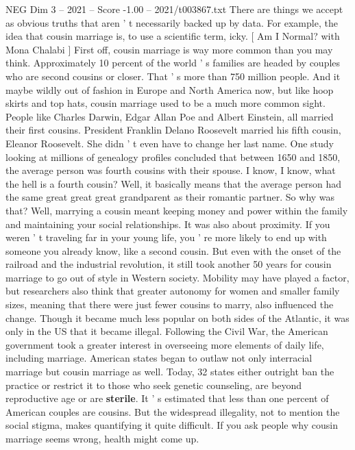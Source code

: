 \begin{textsample}{NEG Dim 3 – 2021 – Score -1.00 – 2021/t003867.txt}  \label{ex:f3_neg_052}
There are things we accept as obvious truths that aren ' t necessarily backed up by data.
For example, the idea that cousin marriage is, to use a scientific term, icky. [ Am I Normal? with Mona Chalabi ] First off, cousin marriage is way more common than you may think.
Approximately 10 percent of the world ' s families are headed by couples who are second cousins or closer.
That ' s more than 750 million people.
And it maybe wildly out of fashion in Europe and North America now, but like hoop skirts and top hats, cousin marriage used to be a much more common sight.
People like Charles Darwin, Edgar Allan Poe and Albert Einstein, all married their first cousins.
President Franklin Delano Roosevelt married his fifth cousin, Eleanor Roosevelt.
She didn ' t even have to change her last name.
One study looking at millions of genealogy profiles concluded that between 1650 and 1850, the average person was fourth cousins with their spouse.
I know, I know, what the hell is a fourth cousin?
Well, it basically means that the average person had the same great great great grandparent as their romantic partner.
So why was that?
Well, marrying a cousin meant keeping money and power within the family and maintaining your social relationships.
It was also about proximity.
If you weren ' t traveling far in your young life, you ' re more likely to end up with someone you already know, like a second cousin.
But even with the onset of the railroad and the industrial revolution, it still took another 50 years for cousin marriage to go out of style in Western society.
Mobility may have played a factor, but researchers also think that greater autonomy for women and smaller family sizes, meaning that there were just fewer cousins to marry, also influenced the change.
Though it became much less popular on both sides of the Atlantic, it was only in the US that it became illegal.
Following the Civil War, the American government took a greater interest in overseeing more elements of daily life, including marriage.
American states began to outlaw not only interracial marriage but cousin marriage as well.
Today, 32 states either outright ban the practice or restrict it to those who seek genetic counseling, are beyond reproductive age or are \textbf{sterile}.
It ' s estimated that less than one percent of American couples are cousins.
But the widespread illegality, not to mention the social stigma, makes quantifying it quite difficult.
If you ask people why cousin marriage seems wrong, health might come up.

\end{textsample}
